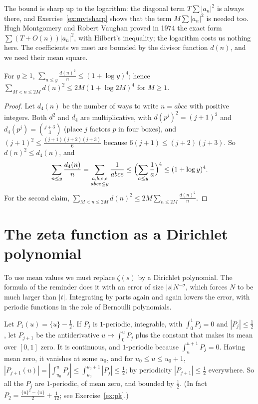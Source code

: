 The bound is sharp up to the logarithm: the diagonal term $T\sum|a_n|^2$ is always there, and Exercise~\ref{ex:mvtsharp} shows that the term $M\sum|a_n|^2$ is needed too. Hugh Montgomery and Robert Vaughan proved in 1974 the exact form $\sum(T+O(n))|a_n|^2$, with Hilbert's inequality; the logarithm costs us nothing here.
The coefficients we meet are bounded by the divisor function $d(n)$, and we need their mean square.

\begin{lemma}\label{lem:dsq}
For $y\ge1$, $\sum_{n\le y}\frac{d(n)^2}n\le(1+\log y)^4$; hence $\sum_{M<n\le2M}d(n)^2\le2M(1+\log2M)^4$ for $M\ge1$.
\end{lemma}
\begin{proof}
Let $d_4(n)$ be the number of ways to write $n=abce$ with positive integers. Both $d^2$ and $d_4$ are multiplicative, with $d(p^j)^2=(j+1)^2$ and $d_4(p^j)=\binom{j+3}3$ (place $j$ factors $p$ in four boxes), and $(j+1)^2\le\frac{(j+1)(j+2)(j+3)}6$ because $6(j+1)\le(j+2)(j+3)$. So $d(n)^2\le d_4(n)$, and
\[
\sum_{n\le y}\frac{d_4(n)}n=\sum_{\substack{a,b,c,e\\abce\le y}}\frac1{abce}\le\Bigl(\sum_{a\le y}\frac1a\Bigr)^4\le(1+\log y)^4.
\]
For the second claim, $\sum_{M<n\le2M}d(n)^2\le2M\sum_{n\le2M}\frac{d(n)^2}n$.
\end{proof}

\section{The zeta function as a Dirichlet polynomial}

To use mean values we must replace $\zeta(s)$ by a Dirichlet polynomial. The formula of the reminder does it with an error of size $|s|N^{-\sigma}$, which forces $N$ to be much larger than $|t|$. Integrating by parts again and again lowers the error, with periodic functions in the role of Bernoulli polynomials.

Let $P_1(u)=\{u\}-\frac12$. If $P_j$ is $1$-periodic, integrable, with $\int_0^1P_j=0$ and $|P_j|\le\frac12$, let $P_{j+1}$ be the antiderivative $u\mapsto\int_0^uP_j$ plus the constant that makes its mean over $[0,1]$ zero. It is continuous, and $1$-periodic because $\int_u^{u+1}P_j=0$. Having mean zero, it vanishes at some $u_0$, and for $u_0\le u\le u_0+1$,
$|P_{j+1}(u)|=|\int_{u_0}^uP_j|\le\int_{u_0}^{u_0+1}|P_j|\le\frac12$; by periodicity $|P_{j+1}|\le\frac12$ everywhere. So all the $P_j$ are $1$-periodic, of mean zero, and bounded by $\frac12$. (In fact $P_2=\frac{\{u\}^2-\{u\}}2+\frac1{12}$; see Exercise~\ref{ex:pk}.)

